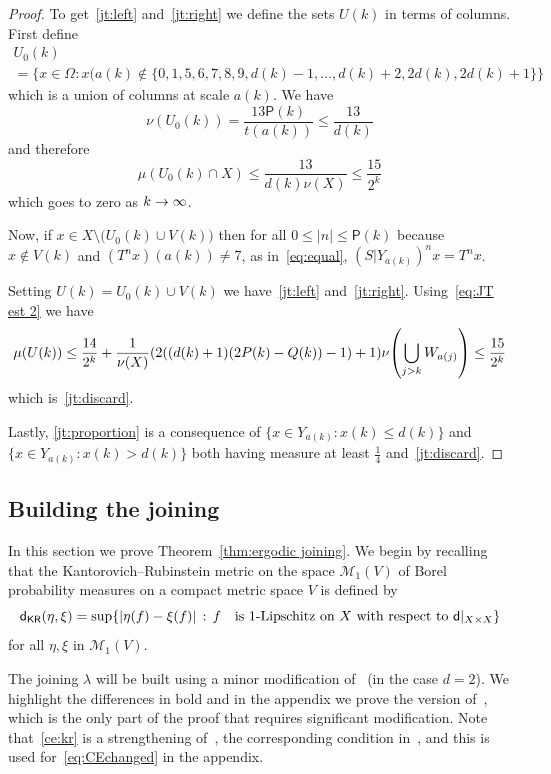 \documentclass[AHL,Unicode,longabstracts,published]{cedram}
\newcommand{\metric}{\mathsf{d}}
\newcommand{\KR}{\mathsf{KR}}
\renewcommand{\P}{\mathsf{P}}
\newcommand{\meas}{\mathcal{M}}
\let\originalleft\left
\let\originalright\right
\renewcommand{\left}{\mathopen{}\mathclose\bgroup\originalleft}
\renewcommand{\right}{\aftergroup\egroup\originalright}
\renewcommand*{\to}{\mathchoice{\longrightarrow}{\rightarrow}{\rightarrow}{\rightarrow}}
\newcommand*{\MK}{\mkern 2mu}
\begin{document}
\begin{proof}
To get~\eqref{jt:left} and~\eqref{jt:right} we define the sets $U(k)$ in terms of columns. First define
\begin{multline}\label{eq:U}
U_0(k)\\
=\bigl\{x\in \Omega:x(a(k)\notin \{0,1,5,6,7,8,9,d(k)-1,\dots,d(k)+2,2d(k),2d(k)+1\}\bigr\}
\end{multline}
which is a union of columns at scale $a(k)$. We have
\[
\nu(U_0(k)) = \frac{13 \P(k)}{t(a(k))} \le \frac{13}{d(k)}
\]
and therefore
\begin{equation}\label{eq:JT est 2}
\mu(U_0(k) \cap X) \le \frac{13}{d(k) \nu(X)} \le \frac{15}{2^k}
\end{equation}
which goes to zero as $k \to \infty$.


Now, if
$
x \in X \setminus \bigl(U_0(k) \cup V(k)\bigr)
$
then for all $0\leq |n|\leq \P(k)$ because $x \notin V(k)$ and $(T^nx)(a(k))\neq 7$, as in~\eqref{eq:equal}, $(S|Y_{a(k)})^nx=T^nx$.

Setting $U(k)=U_0(k) \cup V(k)$ we have~\eqref{jt:left} and~\eqref{jt:right}. Using~\eqref{eq:JT est 2} we have
\[
\mu(U(k))
\leq
\frac{14}{2^k}
+
\frac 1 {\nu(X)}
(2( (d(k) + 1) (2P(k) - Q(k)) - 1) + 1)
\nu\left(\bigcup_{j>k}W_{a(j)}\right)\leq \frac {15} {2^k}
\]
which is~\eqref{jt:discard}.

Lastly, \eqref{jt:proportion} is a consequence of $\{ x \in Y_{a(k)} : x(k) \le d(k) \}$ and $\{x \in Y_{a(k)} : x(k) > d(k) \}$ both having measure at least $\frac{1}{4}$ and~\eqref{jt:discard}.
\end{proof}


\subsection{Building the joining}\label{subsec:apply_CE}

In this section we prove Theorem~\ref{thm:ergodic joining}. We begin by recalling that the Kantorovich--Rubinstein metric on the space $\meas_1(V)$ of Borel probability measures on a compact metric space $V$ is defined by
\[
\metric_\KR(\eta,\xi) = \sup \left\{ | \eta(f) - \xi(f) | \,:\, f \quad\text{is 1-Lipschitz on $X$ with respect to } \metric|_{X\times X} \right\}
\]
for all $\eta, \xi$ in $\meas_1(V)$.



The joining $\lambda$ will be built using a minor modification of~\cite[Proposition~3.1]{MR4269425} (in the case $d=2$). We highlight the differences in bold and in the appendix we prove the version of~\cite[Corollary~3.3]{MR4269425}, which is the only part of the proof that requires significant modification. Note that~\eqref{ce:kr} is a strengthening of~\cite[Proposition~3.1$\MK$(B)]{MR4269425}, the corresponding condition in~\cite{MR4269425}, and this is used for~\eqref{eq:CEchanged} in the appendix.
\end{document}
